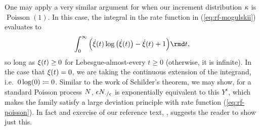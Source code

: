 \begin{example}[Poisson]
  \label{example:poisson}
  One may apply a very similar argument for when our increment distribution $\kappa$ is $\operatorname{Poisson}(1)$.
  In this case, the integral in the rate function in (\ref{eq:rf-mogulskii}) evaluates to
  \begin{equation}
    \label{eq:rf-poisson}
    \int_0^\infty \Big( \dot\pathVar(t)  \log\big(\dot\pathVar(t)\big) - \dot\pathVar(t) + 1 \Big) \rmd t,
  \end{equation}
  so long as $\xi(t) \geq 0$ for Lebesgue-almost-every $t \geq 0$ (otherwise, it is infinite).
  In the case that $\xi(t) = 0$, we are taking the continuous extension of the integrand, i.e.\ $0\log(0) \coloneqq 0$.
  Similar to the work of Schilder's theorem, we may show, for a standard Poisson process $N$, $\epsilon N_{\cdot/\epsilon}$ is exponentially equivalent to this $Y^\epsilon$, which makes the family satisfy a large deviation principle with rate function (\ref{eq:rf-poisson}).
  In fact and exercise of our reference text, \cite[Exercise 5.2.12]{dembo2010}, suggests the reader to show just this.


\end{example}
